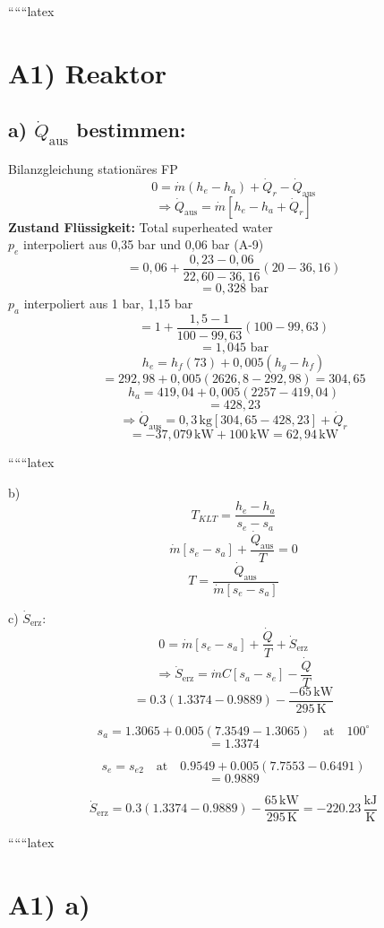 
``````latex


\section*{A1) Reaktor}

\subsection*{a) $\dot{Q}_{\text{aus}}$ bestimmen:}
Bilanzgleichung stationäres FP
\[
0 = \dot{m} (h_e - h_a) + \dot{Q}_r - \dot{Q}_{\text{aus}}
\]
\[
\Rightarrow \dot{Q}_{\text{aus}} = \dot{m} [h_e - h_a + \dot{Q}_r]
\]
\textbf{Zustand Flüssigkeit:} Total superheated water \\
$p_e$ interpoliert aus 0,35 bar und 0,06 bar (A-9)
\[
= 0,06 + \frac{0,23 - 0,06}{22,60 - 36,16} (20 - 36,16)
\]
\[
= 0,328 \text{ bar}
\]
$p_a$ interpoliert aus 1 bar, 1,15 bar
\[
= 1 + \frac{1,5 - 1}{100 - 99,63} (100 - 99,63)
\]
\[
= 1,045 \text{ bar}
\]
\[
h_e = h_f (73) + 0,005 (h_{g} - h_{f})
\]
\[
= 292,98 + 0,005 (2626,8 - 292,98) = 304,65
\]
\[
h_a = 419,04 + 0,005 (2257 - 419,04)
\]
\[
= 428,23
\]
\[
\Rightarrow \dot{Q}_{\text{aus}} = 0,3 \, \text{kg} \left[ 304,65 - 428,23 \right] + \dot{Q}_r
\]
\[
= -37,079 \, \text{kW} + 100 \, \text{kW} = 62,94 \, \text{kW}
\]

``````latex

b) 
\[
T_{KLT} = \frac{h_e - h_a}{s_e - s_a}
\]
\[
\dot{m} [s_e - s_a] + \frac{\dot{Q}_{\text{aus}}}{T} = 0
\]
\[
T = \frac{\dot{Q}_{\text{aus}}}{\dot{m} [s_e - s_a]}
\]

c) \(\dot{S}_{\text{erz}}\):
\[
0 = \dot{m} [s_e - s_a] + \frac{\dot{Q}}{T} + \dot{S}_{\text{erz}}
\]
\[
\Rightarrow \dot{S}_{\text{erz}} = \dot{m} C [s_a - s_e] - \frac{\dot{Q}}{T}
\]
\[
= 0.3 (1.3374 - 0.9889) - \frac{-65 \, \text{kW}}{295 \, \text{K}}
\]

\[
s_a = 1.3065 + 0.005 (7.3549 - 1.3065) \quad \text{at} \quad 100^\circ
\]
\[
= 1.3374
\]

\[
s_e = s_{e2} \quad \text{at} \quad 0.9549 + 0.005 (7.7553 - 0.6491)
\]
\[
= 0.9889
\]

\[
\dot{S}_{\text{erz}} = 0.3 (1.3374 - 0.9889) - \frac{65 \, \text{kW}}{295 \, \text{K}} = -220.23 \, \frac{\text{kJ}}{\text{K}}
\]

``````latex


\section*{A1) a)}

